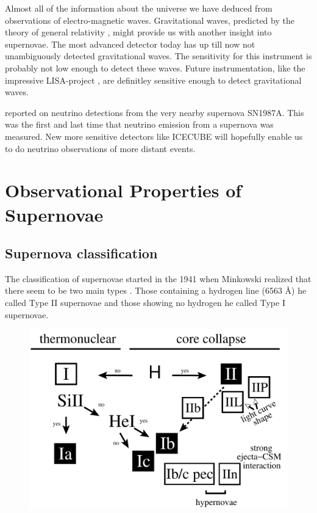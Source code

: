 Almost all of the information about the universe we have deduced from observations of electro-magnetic waves. 
Gravitational waves, predicted by the theory of general relativity  \cite{1918SPAW.......154E}, might provide us with another insight into supernovae. The most advanced detector today \cite[LIGO][]{1992Sci...256..325A} has up till now not unambiguously detected gravitational waves. The sensitivity for this instrument is probably not low enough to detect these waves. Future instrumentation, like the impressive LISA-project \citep{1994ESAJ...18..219J}, are definitley sensitive enough to detect gravitational waves.

\citet{1987PhRvL..58.1494B,1987PhRvL..58.1490H,Alekseev:1988gp} reported on neutrino detections from the very nearby supernova SN1987A. This was the first and last time that neutrino emission from a supernova was measured. New more sensitive detectors like ICECUBE \citep{2008ICRC....4..835K} will hopefully enable us to do neutrino observations of more distant events.


\section{Observational Properties of Supernovae}

\subsection{Supernova classification}
\label{sec:sn_classification}

The classification of supernovae started in the 1941 when Minkowski realized that there seem to be two main types \citep{1941PASP...53..224M}. Those containing a hydrogen line (6563 \AA) he called Type II supernovae and those showing no hydrogen he called Type I supernovae.  

\begin{figure}[htbp] %
   \centering
   \includegraphics[width=\textwidth]{chapter_intro/plots/sn_classification.pdf} 
   \caption{}
   \label{fig:sn_classification}
\end{figure}

